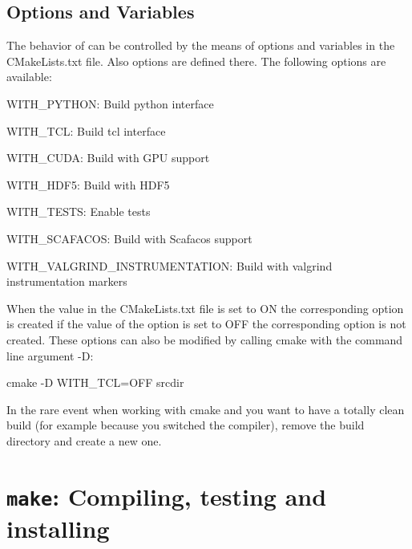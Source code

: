\subsection{Options and Variables}
The behavior of  can be
controlled by the means of options and variables in the CMakeLists.txt file. Also options are defined there.
The following options are available:
\begin{description}
	\item WITH_PYTHON: Build python interface
	\item WITH_TCL: Build tcl interface
	\item WITH_CUDA: Build with GPU support
        \item WITH_HDF5: Build with HDF5
	\item WITH_TESTS: Enable tests
	\item WITH_SCAFACOS: Build with Scafacos support
	\item WITH_VALGRIND_INSTRUMENTATION: Build with valgrind instrumentation markers
\end{description}
When the value in the CMakeLists.txt file is set to ON the corresponding option is created if the value of the option is set to OFF the corresponding option is not created. 
These options can also be modified by calling cmake with the command line argument -D:
\begin{code}
cmake -D WITH_TCL=OFF srcdir 
\end{code}
In the rare event when working with cmake and you want to have a totally clean build (for example because you switched the compiler), remove the build directory and create a new one.
\section{\texttt{make}: Compiling,  testing and installing \es}
\label{sec:make}

